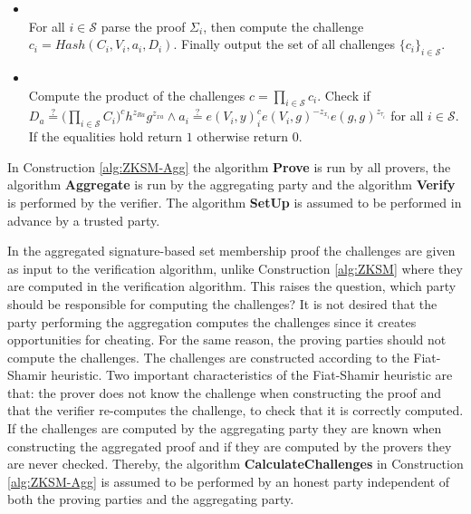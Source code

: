 \begin{algorithm}[]
\begin{itemize}
\item {}\\
For all $i\in\mathcal{S}$ parse the proof $\Sigma_i$, then compute the challenge $c_i = Hash(C_i,V_i,a_i,D_i)$. Finally output the set of all challenges $\{c_i\}_{i\in\mathcal{S}}$. 

\item{} \\
Compute the product of the challenges $c=\prod_{i\in\mathcal{S}} c_i$. Check if $D_a\overset{?}{=} \big( \prod_{i\in\mathcal{S}}C_i\big)^ch^{z_{Ra}}g^{z_{xa}}\wedge a_i \overset{?}{=} e(V_i,y)^c_i e(V_i,g)^{-z_{x_i}}e(g,g)^{z_{\tau_i}}$ for all $i\in\mathcal{S}$. If the equalities hold return $1$ otherwise return $0$.
\end{itemize}
\label{alg:ZKSM-Agg}
\end{algorithm} 


In Construction \ref{alg:ZKSM-Agg} the algorithm \textbf{Prove} is run by all provers, the algorithm \textbf{Aggregate} is run by the aggregating party and the algorithm \textbf{Verify} is performed by the verifier. The algorithm \textbf{SetUp} is assumed to be performed in advance by a trusted party.

In the aggregated signature-based set membership proof the challenges are given as input to the verification algorithm, unlike Construction \ref{alg:ZKSM} where they are computed in the verification algorithm. This raises the question, which party should be responsible for computing the challenges?  It is not desired that the party performing the aggregation computes the challenges since it creates opportunities for cheating.  For the same reason, the proving parties should not compute the challenges. The challenges are constructed according to the Fiat-Shamir heuristic. Two important characteristics of the Fiat-Shamir heuristic are that: the prover does not know the challenge when constructing the proof and that the verifier re-computes the challenge, to check that it is correctly computed.  If the challenges are computed by the aggregating party they are known when constructing the aggregated proof and if they are computed by the provers they are never checked. Thereby, the algorithm \textbf{CalculateChallenges} in Construction \ref{alg:ZKSM-Agg} is assumed to be performed by an honest party independent of both the proving parties and the aggregating party. 


